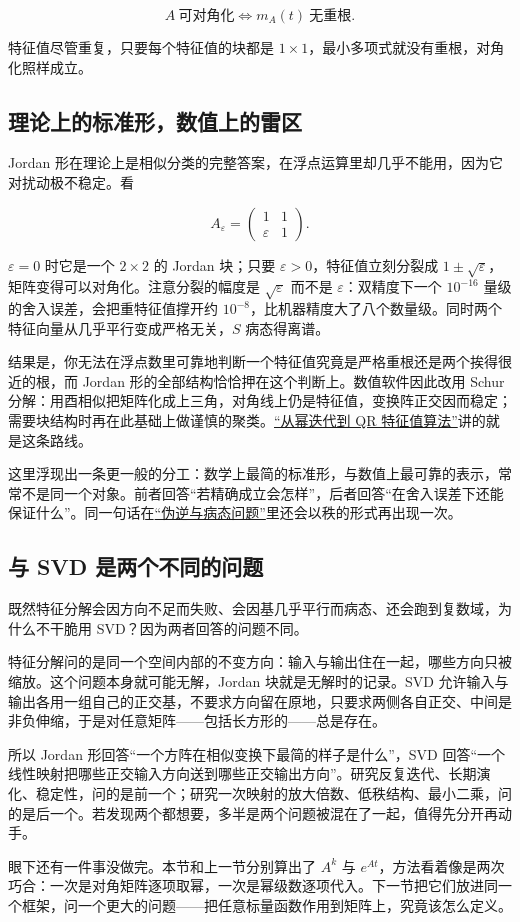 \[
A\ \text{可对角化}
\iff
m_A(t)\ \text{无重根}.
\]

特征值尽管重复，只要每个特征值的块都是 \(1\times 1\)，最小多项式就没有重根，对角化照样成立。

\subsection{理论上的标准形，数值上的雷区}

Jordan 形在理论上是相似分类的完整答案，在浮点运算里却几乎不能用，因为它对扰动极不稳定。看

\[
A_\varepsilon=\begin{pmatrix}1&1\\ \varepsilon&1\end{pmatrix}.
\]

\(\varepsilon=0\) 时它是一个 \(2\times 2\) 的 Jordan 块；只要 \(\varepsilon>0\)，特征值立刻分裂成 \(1\pm\sqrt{\varepsilon}\)，矩阵变得可以对角化。注意分裂的幅度是 \(\sqrt{\varepsilon}\) 而不是 \(\varepsilon\)：双精度下一个 \(10^{-16}\) 量级的舍入误差，会把重特征值撑开约 \(10^{-8}\)，比机器精度大了八个数量级。同时两个特征向量从几乎平行变成严格无关，\(S\) 病态得离谱。

结果是，你无法在浮点数里可靠地判断一个特征值究竟是严格重根还是两个挨得很近的根，而 Jordan 形的全部结构恰恰押在这个判断上。数值软件因此改用 Schur 分解：用酉相似把矩阵化成上三角，对角线上仍是特征值，变换阵正交因而稳定；需要块结构时再在此基础上做谨慎的聚类。\hyperref[sec:08-Numerical-Analysis/05-Numerical-Linear-Algebra/05]{``从幂迭代到 QR 特征值算法''}讲的就是这条路线。

这里浮现出一条更一般的分工：数学上最简的标准形，与数值上最可靠的表示，常常不是同一个对象。前者回答``若精确成立会怎样''，后者回答``在舍入误差下还能保证什么''。同一句话在\hyperref[sec:03-Linear-Algebra/07-SVD-and-Data-Applications/02]{``伪逆与病态问题''}里还会以秩的形式再出现一次。

\subsection{与 SVD 是两个不同的问题}

既然特征分解会因方向不足而失败、会因基几乎平行而病态、还会跑到复数域，为什么不干脆用 SVD？因为两者回答的问题不同。

特征分解问的是同一个空间内部的不变方向：输入与输出住在一起，哪些方向只被缩放。这个问题本身就可能无解，Jordan 块就是无解时的记录。SVD 允许输入与输出各用一组自己的正交基，不要求方向留在原地，只要求两侧各自正交、中间是非负伸缩，于是对任意矩阵——包括长方形的——总是存在。

所以 Jordan 形回答``一个方阵在相似变换下最简的样子是什么''，SVD 回答``一个线性映射把哪些正交输入方向送到哪些正交输出方向''。研究反复迭代、长期演化、稳定性，问的是前一个；研究一次映射的放大倍数、低秩结构、最小二乘，问的是后一个。若发现两个都想要，多半是两个问题被混在了一起，值得先分开再动手。

眼下还有一件事没做完。本节和上一节分别算出了 \(A^k\) 与 \(e^{At}\)，方法看着像是两次巧合：一次是对角矩阵逐项取幂，一次是幂级数逐项代入。下一节把它们放进同一个框架，问一个更大的问题——把任意标量函数作用到矩阵上，究竟该怎么定义。
